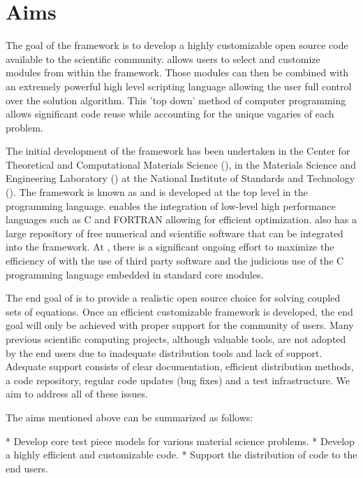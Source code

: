 \section{Aims}

The goal of the \FiPy{} framework is to develop a highly customizable
open source code available to the scientific community. \FiPy{} allows
users to select and customize modules from within the framework. Those
modules can then be combined with an extremely powerful high level
scripting language allowing the user full control over the solution
algorithm. This 'top down' method of computer programming allows
significant code reuse while accounting for the unique vagaries of
each problem.

The initial development of the framework has been undertaken in the
Center for Theoretical and Computational Materials Science (\CTCMS{}),
in the Materials Science and Engineering Laboratory (\MSEL{}) at the
National Institute of Standards and Technology (\NIST{}). The framework
is known as \FiPy{} and is developed at the top level in the \Python{}
programming language. \Python{} enables the integration of low-level
high performance languages such as C and FORTRAN allowing for
efficient optimization. \Python{} also has a large repository of free
numerical and scientific software that can be integrated into the
\FiPy{} framework. At \NIST{}, there is a significant ongoing effort to
maximize the efficiency of \FiPy{} with the use of third party software
and the judicious use of the C programming language embedded in
standard core modules.

The end goal of \FiPy{} is to provide a realistic open source choice
for solving coupled sets of equations. Once an efficient customizable
framework is developed, the end goal will only be achieved with proper
support for the community of users. Many previous scientific computing
projects, although valuable tools, are not adopted by the end users
due to inadequate distribution tools and lack of support. Adequate
support consists of clear documentation, efficient distribution
methods, a code repository, regular code updates (bug fixes) and a
test infrastructure. We aim to address all of these issues.

The aims mentioned above can be summarized as follows:

* Develop core test piece models for various material science problems.
* Develop a highly efficient and customizable code.
* Support the distribution of code to the end users.

